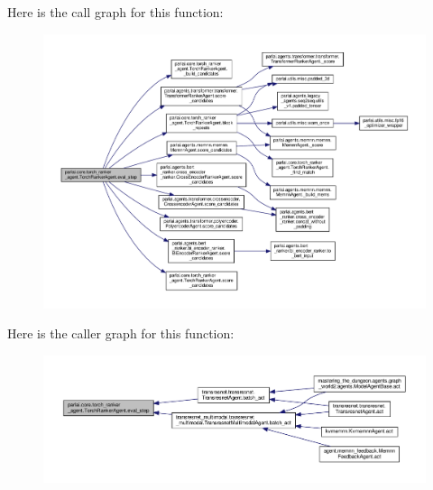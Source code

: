 Here is the call graph for this function\+:
\nopagebreak
\begin{figure}[H]
\begin{center}
\leavevmode
\includegraphics[width=350pt]{classparlai_1_1core_1_1torch__ranker__agent_1_1TorchRankerAgent_a65bca7841123e4c3df1e09f8c4eb397f_cgraph}
\end{center}
\end{figure}
Here is the caller graph for this function\+:
\nopagebreak
\begin{figure}[H]
\begin{center}
\leavevmode
\includegraphics[width=350pt]{classparlai_1_1core_1_1torch__ranker__agent_1_1TorchRankerAgent_a65bca7841123e4c3df1e09f8c4eb397f_icgraph}
\end{center}
\end{figure}
\mbox{\label{classparlai_1_1core_1_1torch__ranker__agent_1_1TorchRankerAgent_a936cebe646816609dd1d4f56b9490d45}} 
